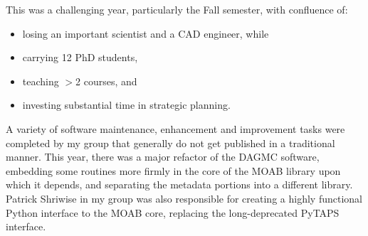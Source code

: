 This was a challenging year, particularly the Fall semester, with confluence of:
\begin{itemize}
\item losing an important scientist and a CAD engineer, while
\item carrying 12 PhD students,
\item teaching $>$2 courses, and
\item investing substantial time in strategic planning.
\end{itemize}

A variety of software maintenance, enhancement and improvement tasks were
completed by my group that generally do not get published in a traditional
manner.  This year, there was a major refactor of the DAGMC software,
embedding some routines more firmly in the core of the MOAB library upon which
it depends, and separating the metadata portions into a different library.
Patrick Shriwise in my group was also responsible for creating a highly
functional Python interface to the MOAB core, replacing the long-deprecated
PyTAPS interface.

